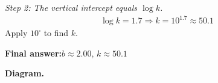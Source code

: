 \documentclass[11pt]{article}
\begin{document}
\textit{Step 2: The vertical intercept equals \( \log k \).}
\[\begin{gathered}
\log k = 1.7 \Rightarrow k = 10^{1.7} \approx 50.1
\end{gathered}\]
Apply \( 10^{\square} \) to find \( k \).

\begin{answerbox}
\textbf{Final answer:}\quad \(\displaystyle  b \approx 2.00 \), \(\displaystyle  k \approx 50.1 \)
\end{answerbox}
\textbf{Diagram.}

\begin{center}
\end{center}
\end{document}
